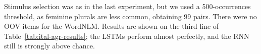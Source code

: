 Stimulus selection was as in the last experiment, but we used a 500-occurrences
threshold, as feminine plurals are less common, obtaining 99 pairs. %
There were no OOV items for the WordNLM. %
Results are shown on the third line of
Table~\ref{tab:ital-agr-results}; the LSTMs perform almost perfectly,
and the RNN still is strongly above chance.

